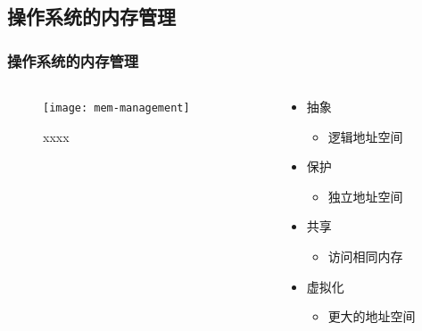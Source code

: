 \subsection{操作系统的内存管理} %

\begin{frame}[plain,t]
    
    \frametitle{操作系统的内存管理}
    \begin{columns}
        \begin{column}{0.5\textwidth}
		    \begin{figure}
		        \centering
		        \texttt{[image: mem-management]}
		        \caption{xxxx}
		    \end{figure}
        \end{column}
        \begin{column}{0.5\textwidth}
		\begin{itemize}
		    \item 抽象
			
		    \begin{itemize}
		        \item 逻辑地址空间
		    \end{itemize}
		    \item 保护
			
		    \begin{itemize}
		        \item 独立地址空间
		    \end{itemize}
		    \item 共享
			
		    \begin{itemize}
		        \item 访问相同内存
		    \end{itemize}
		    \item 虚拟化
			
		    \begin{itemize}
		        \item 更大的地址空间
		    \end{itemize}
		\end{itemize}
        \end{column}
    \end{columns}
\end{frame}
